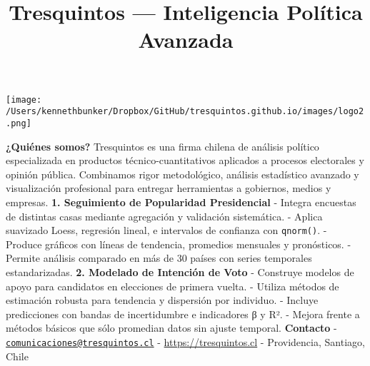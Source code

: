 \documentclass[
  11pt,
]{article}
\title{Tresquintos --- Inteligencia Política Avanzada}
\author{}
\date{\vspace{-2.5em}}
\begin{document}
\maketitle

\begin{center}
\texttt{[image: /Users/kennethbunker/Dropbox/GitHub/tresquintos.github.io/images/logo2.png]}
\end{center}
\vspace{1cm}

\textbf{¿Quiénes somos?} Tresquintos es una firma chilena de análisis
político especializada en productos técnico-cuantitativos aplicados a
procesos electorales y opinión pública. Combinamos rigor metodológico,
análisis estadístico avanzado y visualización profesional para entregar
herramientas a gobiernos, medios y empresas. \textbf{1. Seguimiento de
Popularidad Presidencial} - Integra encuestas de distintas casas
mediante agregación y validación sistemática. - Aplica suavizado Loess,
regresión lineal, e intervalos de confianza con \texttt{qnorm()}. -
Produce gráficos con líneas de tendencia, promedios mensuales y
pronósticos. - Permite análisis comparado en más de 30 países con series
temporales estandarizadas. \textbf{2. Modelado de Intención de Voto} -
Construye modelos de apoyo para candidatos en elecciones de primera
vuelta. - Utiliza métodos de estimación robusta para tendencia y
dispersión por individuo. - Incluye predicciones con bandas de
incertidumbre e indicadores β y R². - Mejora frente a métodos básicos
que sólo promedian datos sin ajuste temporal. \textbf{Contacto} -
\href{mailto:comunicaciones@tresquintos.cl}{\nolinkurl{comunicaciones@tresquintos.cl}}
- \url{https://tresquintos.cl} - Providencia, Santiago, Chile
\end{document}
